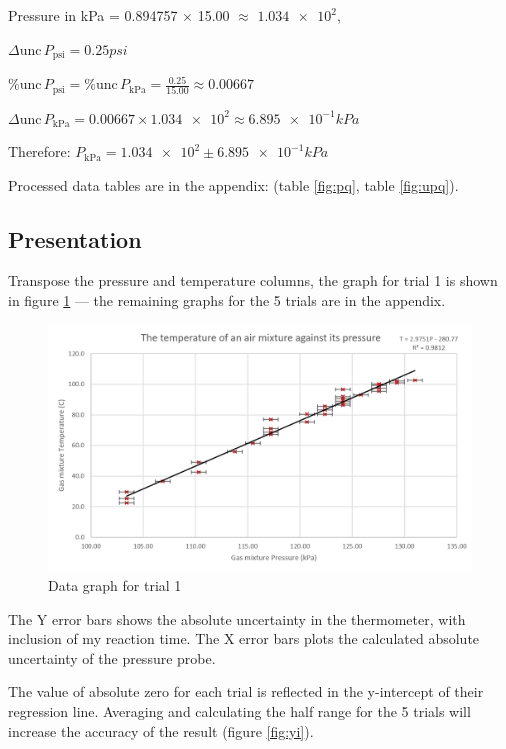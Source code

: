 \documentclass[a4paper,12pt]{article}
\newcommand{\absun}{\Delta \text{unc}\,}
\newcommand{\relun}{\% \text{unc}\,}
\begin{document}
Pressure in kPa = 0.894757 $\times$ 15.00 $\approx$ $\num{1.034e+2}$,

$\absun P_{\text{psi}} = 0.25\si{psi}$

$\relun P_{\text{psi}} = \relun P_{\text{kPa}} =  \frac{0.25}{15.00} \approx 0.00667$

$\absun P_{\text{kPa}} = 0.00667 \times \num{1.034e+2} \approx \num{6.895e-1} \si{kPa}$

Therefore: $P_{\text{kPa}} = \num{1.034e+2} \pm \num{6.895e-1} \si{kPa}$


Processed data tables are in the appendix: (table \ref{fig:pq}, table \ref{fig:upq}).

\subsection{Presentation}

Transpose the pressure and temperature columns, the graph for trial 1 is shown in figure \ref{fig:t1} --- the remaining graphs for the 5 trials are in the appendix.

\begin{figure}[H]
    \centering
    \includegraphics[width=\textwidth]{assets/graph1.png}
    \caption{Data graph for trial 1}
    \label{fig:t1}
\end{figure}

The Y error bars shows the absolute uncertainty in the thermometer, with inclusion of my reaction time. The X error bars plots the calculated absolute uncertainty of the pressure probe.

The value of absolute zero for each trial is reflected in the y-intercept of their regression line. Averaging and calculating the half range for the 5 trials will increase the accuracy of the result (figure \ref{fig:yi}).
\end{document}
